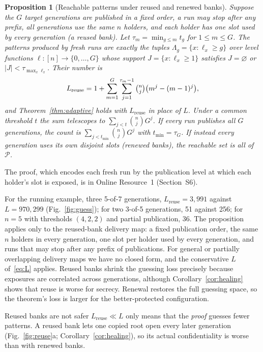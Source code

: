 \documentclass[pdflatex,sn-mathphys-num]{sn-jnl}%
\theoremstyle{plain}
\newtheorem{proposition}[theorem]{Proposition}
\theoremstyle{definition}
\begin{document}
\begin{proposition}[Reachable patterns under reused and renewed banks]\label{prop:patterns}
Suppose the $G$ target generations are published in a fixed order, a run may stop after any prefix, all generations use the same $n$ holders, and each holder has one slot used by every generation (a reused bank). Let $\tau_m=\min_{g\le m}t_g$ for $1\le m\le G$. The patterns produced by fresh runs are exactly the tuples $\Lambda_g=\{x:\ell_x\ge g\}$ over level functions $\ell:[n]\to\{0,\dots,G\}$ whose support $J=\{x:\ell_x\ge1\}$ satisfies $J=\varnothing$ or $|J|<\tau_{\max_x\ell_x}$. Their number is
\[
 L_{\mathrm{reuse}}=1+\sum_{m=1}^{G}\sum_{j=1}^{\tau_m-1}\tbinom nj\big(m^j-(m-1)^j\big),
\]
and Theorem~\ref{thm:adaptive} holds with $L_{\mathrm{reuse}}$ in place of $L$. Under a common threshold $t$ the sum telescopes to $\sum_{j<t}\binom njG^j$. If every run publishes all $G$ generations, the count is $\sum_{j<t_{\min}}\binom njG^j$ with $t_{\min}=\tau_G$. If instead every generation uses its own disjoint slots (renewed banks), the reachable set is all of $\mathcal P$.
\end{proposition}
The proof, which encodes each fresh run by the publication level at which each holder's slot is exposed, is in Online Resource~1 (Section~S6).

For the running example, three 5-of-7 generations, $L_{\mathrm{reuse}}=3{,}991$ against $L=970{,}299$ (Fig.~\ref{fig:guess}); for two 3-of-5 generations, 51 against 256; for $n=5$ with thresholds $(4,2,2)$ and partial publication, 36. The proposition applies only to the reused-bank delivery map: a fixed publication order, the same $n$ holders in every generation, one slot per holder used by every generation, and runs that may stop after any prefix of publications. For general or partially overlapping delivery maps we have no closed form, and the conservative $L$ of~\eqref{eq:L} applies. Reused banks shrink the guessing loss precisely because exposures are correlated across generations, although Corollary~\ref{cor:healing} shows that reuse is worse for secrecy. Renewal restores the full guessing space, so the theorem's loss is larger for the better-protected configuration.

\begin{warnbox}{Reused banks are not safer}
$L_{\mathrm{reuse}}\ll L$ only means that the \emph{proof} guesses fewer patterns. A reused bank lets one copied root open every later generation (Fig.~\ref{fig:reuse}a; Corollary~\ref{cor:healing}), so its actual confidentiality is worse than with renewed banks.
\end{warnbox}
\end{document}
